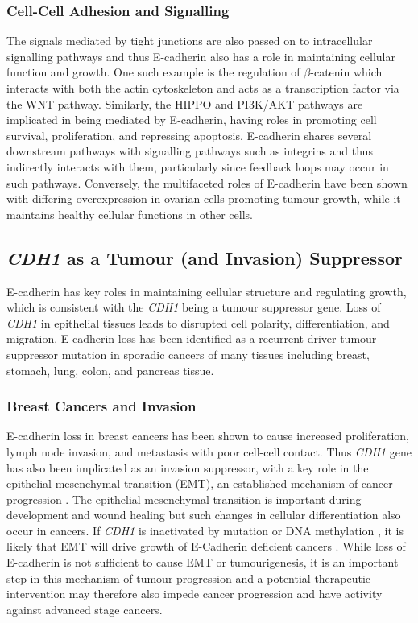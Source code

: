 \subsubsection{Cell-Cell Adhesion and Signalling}
The signals mediated by tight junctions are also passed on to intracellular signalling pathways and thus E-cadherin also has a role in maintaining cellular function and growth. One such example is the regulation of $\beta$-catenin which interacts with both the actin cytoskeleton and acts as a transcription factor via the WNT pathway. Similarly, the HIPPO and PI3K/AKT pathways are implicated in being mediated by E-cadherin, having roles in promoting cell survival, proliferation, and repressing apoptosis. E-cadherin shares several downstream pathways with signalling pathways such as integrins and thus indirectly interacts with them, particularly since feedback loops may occur in such pathways. Conversely, the multifaceted roles of E-cadherin have been shown with differing overexpression in ovarian cells promoting tumour growth, while it maintains healthy cellular functions in other cells.

\subsection{\textit{CDH1} as a Tumour (and Invasion) Suppressor}
E-cadherin has key roles in maintaining cellular structure and regulating growth, which is consistent with the \textit{CDH1} being a tumour suppressor gene. Loss of \textit{CDH1} in epithelial tissues leads to disrupted cell polarity, differentiation, and  migration. E-cadherin loss has been identified as a recurrent driver tumour suppressor mutation in sporadic cancers of many tissues including breast, stomach, lung, colon, and pancreas tissue.

\subsubsection{Breast Cancers and Invasion}
E-cadherin loss in breast cancers has been shown to cause increased proliferation, lymph node invasion, and metastasis with poor cell-cell contact. Thus \textit{CDH1} gene has also been implicated as an invasion suppressor, with a key role in the epithelial-mesenchymal transition (EMT), an established mechanism of cancer progression \cite{Hanahan2011}. The epithelial-mesenchymal transition is important during development and wound healing but such changes in cellular differentiation also occur in cancers. If \textit{CDH1} is inactivated by mutation or DNA methylation \cite{Berx1996,Guilford1999,Machado2001}, it is likely that EMT will drive growth of E-Cadherin deficient cancers \cite{Berx2009,Graziano2003,Polyak2009}. While loss of E-cadherin is not sufficient to cause EMT or tumourigenesis, it is an important step in this mechanism of tumour progression and a potential therapeutic intervention may therefore also impede cancer progression and have activity against advanced stage cancers.

